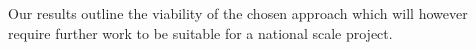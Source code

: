 \documentclass[11pt, a4paper, oneside]{Thesis} %
\begin{document}
{Our results outline the viability of the chosen approach which will however require further work to be suitable
for a national scale project.








}
\end{document}
